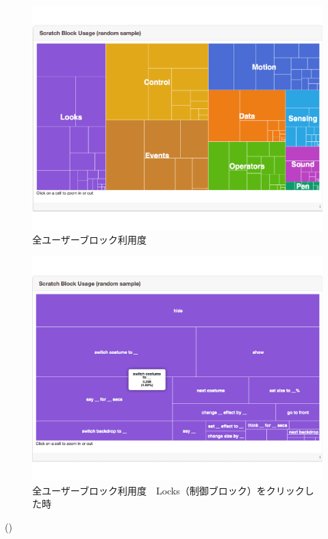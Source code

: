 \documentclass[a4paper,10pt,onecolumn,oneside,openany]{jsbook}
\begin{document}
\begin{figure}[ht]
  \centering
    \includegraphics[scale=0.5]{graphic/scratch_block0.pdf}
  \caption{全ユーザーブロック利用度}
  \label{blockan}
 \end{figure}
 
 \begin{figure}[ht]
  \centering
    \includegraphics[scale=0.5]{graphic/scratch_block.pdf}
  \caption{全ユーザーブロック利用度　Locks（制御ブロック）をクリックした時}
  \label{blockdit}
 \end{figure}
 
 
(\cite{preEssay3})
\end{document}
